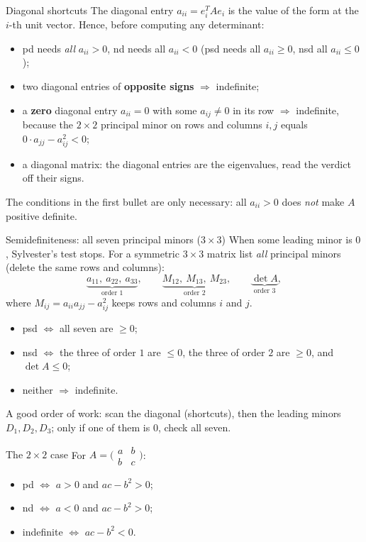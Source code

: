 \begin{rulebox}{Diagonal shortcuts}
The diagonal entry $a_{ii} = e_{i}^{T} A e_{i}$ is the value of the form at
the $i$-th unit vector. Hence, before computing any determinant:
\begin{itemize}[leftmargin=1.6em,itemsep=0.3ex]
    \item pd needs \emph{all} $a_{ii} > 0$, nd needs all $a_{ii} < 0$
          (psd needs all $a_{ii} \ge 0$, nsd all $a_{ii} \le 0$);
    \item two diagonal entries of \textbf{opposite signs} $\Rightarrow$ indefinite;
    \item a \textbf{zero} diagonal entry $a_{ii} = 0$ with some $a_{ij} \neq 0$
          in its row $\Rightarrow$ indefinite, because the $2 \times 2$
          principal minor on rows and columns $i, j$ equals
          $0 \cdot a_{jj} - a_{ij}^{2} < 0$;
    \item a diagonal matrix: the diagonal entries are the eigenvalues, read
          the verdict off their signs.
\end{itemize}
The conditions in the first bullet are only necessary: all $a_{ii} > 0$
does \emph{not} make $A$ positive definite.
\end{rulebox}

\begin{rulebox}{Semidefiniteness: all seven principal minors ($3 \times 3$)}
When some leading minor is $0$, Sylvester's test stops. For a symmetric
$3 \times 3$ matrix list \emph{all} principal minors (delete the same rows
and columns):
\[
\underbrace{a_{11},\ a_{22},\ a_{33}}_{\text{order }1},\qquad
\underbrace{M_{12},\ M_{13},\ M_{23}}_{\text{order }2},\qquad
\underbrace{\det A}_{\text{order }3},
\]
where $M_{ij} = a_{ii} a_{jj} - a_{ij}^{2}$ keeps rows and columns $i$ and $j$.
\begin{itemize}[leftmargin=1.6em,itemsep=0.3ex]
    \item psd $\Leftrightarrow$ all seven are $\ge 0$;
    \item nsd $\Leftrightarrow$ the three of order $1$ are $\le 0$, the three of
          order $2$ are $\ge 0$, and $\det A \le 0$;
    \item neither $\Rightarrow$ indefinite.
\end{itemize}
A good order of work: scan the diagonal (shortcuts), then the leading
minors $D_{1}, D_{2}, D_{3}$; only if one of them is $0$, check all seven.
\end{rulebox}

\begin{rulebox}{The $2 \times 2$ case}
For $A = \bigl(\begin{smallmatrix} a & b \\ b & c \end{smallmatrix}\bigr)$:
\begin{itemize}[leftmargin=1.6em,itemsep=0.3ex]
    \item pd $\Leftrightarrow$ $a > 0$ and $a c - b^{2} > 0$;
    \item nd $\Leftrightarrow$ $a < 0$ and $a c - b^{2} > 0$;
    \item indefinite $\Leftrightarrow$ $a c - b^{2} < 0$.
\end{itemize}
\end{rulebox}

